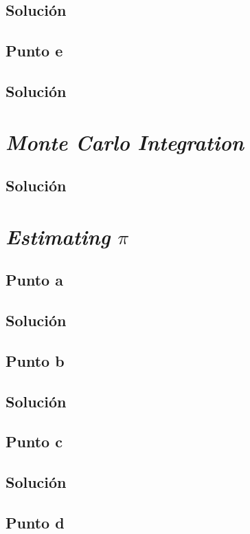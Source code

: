 \documentclass[12pt]{article}
\begin{document}
\subsection{Solución}

\subsection{Punto e}
\subsection{Solución}


\section{\textit{Monte Carlo Integration}}
\subsection{Solución}

\section{\textit{Estimating} \(\pi\)}

\subsection{Punto a}
\subsection{Solución}

\subsection{Punto b}
\subsection{Solución}

\subsection{Punto c}
\subsection{Solución}

\subsection{Punto d}
\end{document}
